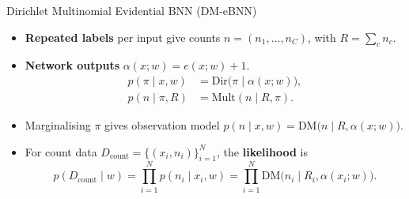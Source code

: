 \begin{frame}{Dirichlet Multinomial Evidential BNN (DM-eBNN)}
\label{frm:count-model}
\setlength{\abovedisplayskip}{4pt}
\setlength{\belowdisplayskip}{4pt}
\begin{itemize}
\setlength{\itemsep}{6mm}
\item \textbf{Repeated labels} per input give counts $n=(n_1,\ldots,n_C) %
$, with $R=\sum_c n_c$.
\item \textbf{Network outputs} $\alpha(x;w)=e(x;w)+1$.
\begin{align*}
p(\pi\mid x,w)&=\mathrm{Dir}\bigl(\pi\mid\alpha(x;w)\bigr),\\[1mm]
p(n\mid\pi,R)&=\mathrm{Mult}(n\mid R,\pi). %
\end{align*}
\item<2-> Marginalising $\pi$ gives observation model $p(n\mid x,w)=\mathrm{DM}\bigl(n\mid R,\alpha(x;w)\bigr)$.
\item<3-> For count data $D_{\mathrm{count}}=\{(x_i,n_i)\}_{i=1}^{N}$, the \textbf{likelihood} is
\[
p(D_{\mathrm{count}}\mid w)
=\prod_{i=1}^{N}p(n_i\mid x_i,w)
=\prod_{i=1}^{N}\mathrm{DM}\bigl(n_i\mid R_i,\alpha(x_i;w)\bigr).
\]
\end{itemize}
\end{frame}


